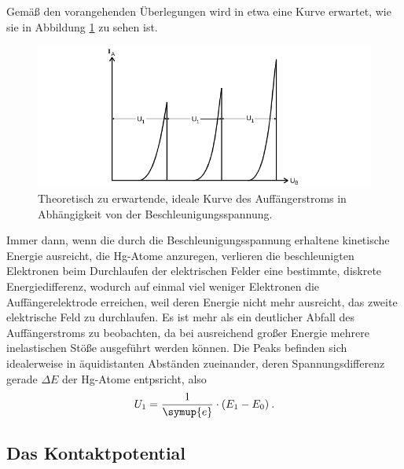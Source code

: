Gemäß den vorangehenden Überlegungen wird in etwa eine Kurve erwartet, wie sie in Abbildung \ref{fig:erwartKurve} zu sehen ist. 
\begin{figure}
    \centering
    \includegraphics[width=\textwidth]{plots/erwartKurve.png}
    \caption{Theoretisch zu erwartende, ideale Kurve des Auffängerstroms in Abhängigkeit von der Beschleunigungsspannung\cite{Versuchsanleitung}.}
    \label{fig:erwartKurve}
\end{figure}
Immer dann, wenn die durch die Beschleunigungsspannung erhaltene kinetische Energie ausreicht, die Hg-Atome anzuregen, 
verlieren die beschleunigten Elektronen beim Durchlaufen der elektrischen Felder eine bestimmte, diskrete Energiedifferenz, 
wodurch auf einmal viel weniger Elektronen die Auffängerelektrode erreichen, weil deren Energie nicht mehr ausreicht, das 
zweite elektrische Feld zu durchlaufen. 
Es ist mehr als ein deutlicher Abfall des Auffängerstroms zu beobachten, da bei ausreichend großer Energie 
mehrere inelastischen Stöße ausgeführt werden können. 
Die Peaks befinden sich idealerweise in äquidistanten 
Abständen zueinander, deren Spannungsdifferenz gerade $\Delta E$ der Hg-Atome entpsricht, also\cite{Versuchsanleitung} 
\begin{equation*}
    U_1= \frac{1}{\symup{e}}\cdot (E_1-E_0)\:.
\end{equation*}

\subsection{Das Kontaktpotential}

